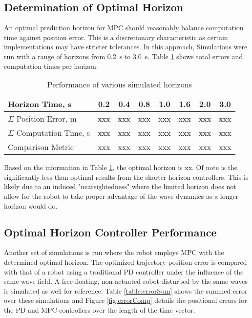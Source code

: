 \documentclass[letterpaper, 10 pt, conferences]{ieeeconf}  %
\begin{document}
\subsection{Determination of Optimal Horizon} \label{results:optimal}

An optimal prediction horizon for MPC should reasonably balance computation time against position error. This is a discretionary characteristic as certain implementations may have stricter tolerances. In this approach, Simulations were run with a range of horizons from 0.2~s to 3.0~s. Table \ref{table:optimalHorizon} shows total errors and computation times per horizon. 

\begin{table}[h]
\caption{Performance of various simulated horizons}
\begin{center}
\def\arraystretch{1.1}%
\begin{tabular}{ |l|c|c|c|c|c|c|c| } 
 \hline 
 Horizon Time, s & 0.2 & 0.4 & 0.8 & 1.0 & 1.6 & 2.0 & 3.0 \\ 
 \hline
 $\Sigma$ Position Error, m & xxx & xxx & xxx & xxx & xxx & xxx & xxx \\ 
 $\Sigma$ Computation Time, s & xxx & xxx & xxx & xxx & xxx & xxx & xxx \\ 
 Comparison Metric & xxx & xxx & xxx & xxx & xxx & xxx & xxx\\
 \hline
\end{tabular}
\end{center}
\label{table:optimalHorizon}
\end{table}

Based on the information in Table \ref{table:optimalHorizon}, the optimal horizon is xx. Of note is the significantly less-than-optimal results from the shorter horizon controllers. This is likely due to an induced "nearsightedness" where the limited horizon does not allow for the robot to take proper advantage of the wave dynamics as a longer horizon would do. 

\subsection{Optimal Horizon Controller Performance} \label{results:perform}

Another set of simulations is run where the robot employs MPC with the determined optimal horizon. The optimized trajectory position error is compared with that of a robot using a traditional PD controller under the influence of the same wave field. A free-floating, non-actuated robot disturbed by the same waves is simulated as well for reference. Table \ref{table:errorSum} shows the summed error over these simulations and Figure \ref{fig:errorComp} details the positional errors for the PD and MPC controllers over the length of the time vector.
\end{document}
